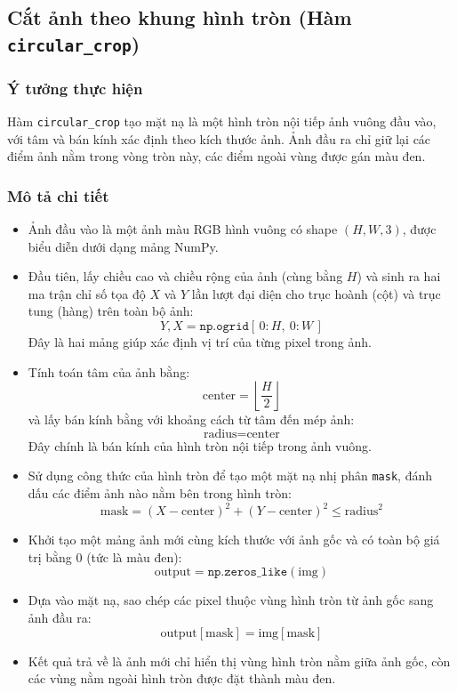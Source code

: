 \subsection{Cắt ảnh theo khung hình tròn (Hàm \texttt{circular\_crop})}

\subsubsection*{Ý tưởng thực hiện}

Hàm \texttt{circular\_crop} tạo mặt nạ là một hình tròn nội tiếp ảnh vuông đầu vào, với tâm và bán kính xác định theo kích thước ảnh. Ảnh đầu ra chỉ giữ lại các điểm ảnh nằm trong vòng tròn này, các điểm ngoài vùng được gán màu đen.


\subsubsection*{Mô tả chi tiết}

\begin{itemize}
  \item Ảnh đầu vào là một ảnh màu RGB hình vuông có shape \( (H, W, 3) \), được biểu diễn dưới dạng mảng NumPy.

  \item Đầu tiên, lấy chiều cao và chiều rộng của ảnh (cùng bằng \( H \)) và sinh ra hai ma trận chỉ số tọa độ \( X \) và \( Y \) lần lượt đại diện cho trục hoành (cột) và trục tung (hàng) trên toàn bộ ảnh:
        \[
          Y, X = \texttt{np.ogrid}[\,0:H,\ 0:W\,]
        \]
        Đây là hai mảng giúp xác định vị trí của từng pixel trong ảnh.

  \item Tính toán tâm của ảnh bằng:
        \[
          \text{center} = \left\lfloor \frac{H}{2} \right\rfloor
        \]
        và lấy bán kính bằng với khoảng cách từ tâm đến mép ảnh:
        \[
          \text{radius} = \text{center}
        \]
        Đây chính là bán kính của hình tròn nội tiếp trong ảnh vuông.

  \item Sử dụng công thức của hình tròn để tạo một mặt nạ nhị phân \texttt{mask}, đánh dấu các điểm ảnh nào nằm bên trong hình tròn:
        \[
          \text{mask} = (X - \text{center})^2 + (Y - \text{center})^2 \leq \text{radius}^2
        \]

  \item Khởi tạo một mảng ảnh mới cùng kích thước với ảnh gốc và có toàn bộ giá trị bằng 0 (tức là màu đen):
        \[
          \text{output} = \texttt{np.zeros\_like}(\text{img})
        \]

  \item Dựa vào mặt nạ, sao chép các pixel thuộc vùng hình tròn từ ảnh gốc sang ảnh đầu ra:
        \[
          \text{output}[\text{mask}] = \text{img}[\text{mask}]
        \]

  \item Kết quả trả về là ảnh mới chỉ hiển thị vùng hình tròn nằm giữa ảnh gốc, còn các vùng nằm ngoài hình tròn được đặt thành màu đen.
\end{itemize}


